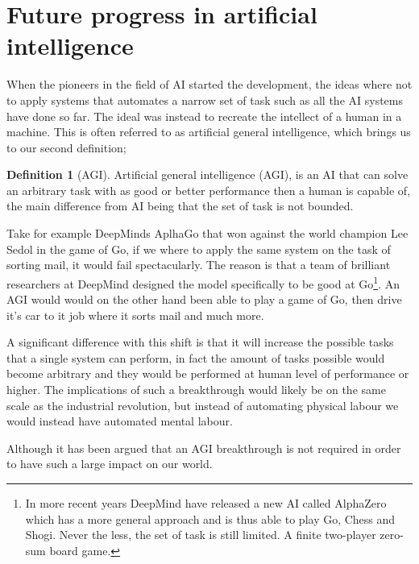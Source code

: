\documentclass[12pt,A4]{report}
\theoremstyle{definition}
\newtheorem{definition}{Definition}[section]
\begin{document}
\section{Future progress in artificial intelligence}
When the pioneers in the field of AI started the development, the ideas where not to apply systems that automates a narrow set of task such as all the AI systems have done so far. The ideal was instead to recreate the intellect of a human in a machine. This is often referred to as artificial general intelligence, which brings us to our second definition;
\begin{definition}[AGI]
Artificial general intelligence (AGI), is an AI that can solve an arbitrary task with as good or better performance then a human is capable of, the main difference from AI being that the set of task is not bounded.
  \label{AGI}
\end{definition}
Take for example DeepMinds AplhaGo that won against the world champion Lee Sedol in the game of Go, if we where to apply the same system on the task of sorting mail, it would fail spectacularly. The reason is that a team of brilliant researchers at DeepMind designed the model specifically to be good at Go\footnote{In more recent years DeepMind have released a new AI called AlphaZero which has a more general approach and is thus able to play Go, Chess and Shogi. Never the less, the set of task is still limited. A finite two-player zero-sum board game.}. An AGI would would on the other hand been able to play a game of Go, then drive it's car to it job where it sorts mail and much more. 

A significant difference with this shift is that it will increase the possible tasks that a single system can perform, in fact the amount of tasks possible would become arbitrary and they would be performed at human level of performance or higher. The implications of such a breakthrough would likely be on the same scale as the industrial revolution, but instead of automating physical labour we would instead have automated mental labour. 

Although it has been argued that an AGI breakthrough is not required in order to have such a large impact on our world. 
\end{document}
